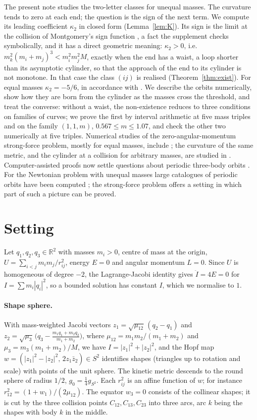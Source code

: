 \documentclass[11pt]{article}
\theoremstyle{definition}
\begin{document}
The present note studies the two-letter classes for unequal masses. The curvature tends to zero at each end; the
question is the sign of the next term. We compute its leading coefficient $\kappa_2$ in closed form
(Lemma~\ref{lem:K}). Its sign is the limit at the collision of Montgomery's sign function \cite[(7.13)]{M05}, a fact
the supplement checks symbolically, and it has a direct geometric meaning: $\kappa_2>0$, i.e.\
$m_k^2(m_i+m_j)^3<m_i^2m_j^2M$, exactly when the end has a waist, a loop shorter than its asymptotic cylinder, so that
the approach of the end to its cylinder is not monotone. In that case the class $(ij)$ is realised
(Theorem~\ref{thm:exist}). For equal masses $\kappa_2=-5/6$, in accordance with \cite{M05}. We describe the orbits
numerically, show how they are born from the cylinder as the masses cross the threshold, and treat the converse:
without a waist, the non-existence reduces to three conditions on families of curves; we prove the first by
interval arithmetic at five mass triples and on the family $(1,1,m)$, $0.567\le m\le1.07$, and check the other two
numerically at five triples. Numerical studies of the zero-angular-momentum strong-force problem, mostly for equal
masses, include \cite{Moo93,DPS17}; the curvature of the same metric, and the cylinder at a collision for arbitrary
masses, are studied in \cite[\S 3.3.1]{KS16}. Computer-assisted proofs now settle questions about periodic three-body
orbits \cite{CGHLM24}. For the Newtonian problem with unequal masses large catalogues of
periodic orbits have been computed \cite{LJL18}; the strong-force problem offers a setting in which part of such a
picture can be proved.

\section{Setting}

Let $q_1,q_2,q_3\in\mathbb R^2$ with masses $m_i>0$, centre of mass at the origin, $U=\sum_{i<j}m_im_j/r_{ij}^2$,
energy $E=0$ and angular momentum $L=0$. Since $U$ is homogeneous of degree $-2$, the Lagrange-Jacobi identity gives
$\ddot I=4E=0$ for $I=\sum m_i|q_i|^2$, so a bounded solution has constant $I$, which we normalise to $1$.

\paragraph{Shape sphere.} With mass-weighted Jacobi vectors
$z_1=\sqrt{\mu_{12}}\,(q_2-q_1)$ and $z_2=\sqrt{\mu_3}\,\bigl(q_3-\tfrac{m_1q_1+m_2q_2}{m_1+m_2}\bigr)$, where
$\mu_{12}=m_1m_2/(m_1+m_2)$ and $\mu_3=m_3(m_1+m_2)/M$, we have $I=|z_1|^2+|z_2|^2$, and the Hopf map
$w=(|z_1|^2-|z_2|^2,\,2z_1\bar z_2)\in S^2$ identifies shapes (triangles up to rotation and scale) with points of the
unit sphere. The kinetic metric descends to the round sphere of radius $1/2$, $g_0=\tfrac14 g_{S^2}$. Each $r_{ij}^2$ is
an affine function of $w$; for instance $r_{12}^2=(1+w_1)/(2\mu_{12})$. The equator $w_3=0$ consists of the collinear
shapes; it is cut by the three collision points $C_{12},C_{13},C_{23}$ into three arcs, arc $k$ being the shapes with
body $k$ in the middle.
\end{document}
